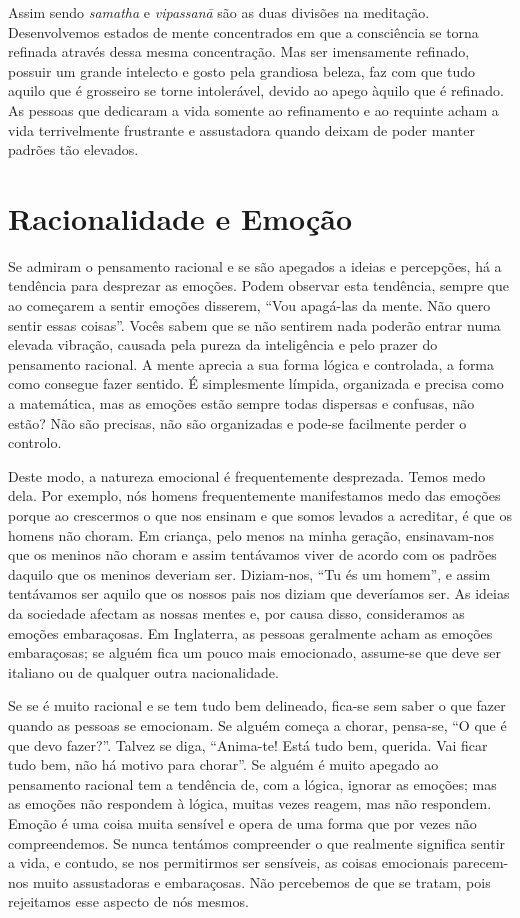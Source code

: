 Assim sendo \emph{samatha} e \emph{vipassanā} são as duas divisões na meditação.
Desenvolvemos estados de mente concentrados em que a consciência se torna
refinada através dessa mesma concentração. Mas ser imensamente refinado, possuir
um grande intelecto e gosto pela grandiosa beleza, faz com que tudo aquilo que é
grosseiro se torne intolerável, devido ao apego àquilo que é refinado. As
pessoas que dedicaram a vida somente ao refinamento e ao requinte acham a vida
terrivelmente frustrante e assustadora quando deixam de poder manter padrões tão
elevados.

\section{Racionalidade e Emoção}

Se admiram o pensamento racional e se são apegados a ideias e percepções, há a
tendência para desprezar as emoções. Podem observar esta tendência, sempre que
ao começarem a sentir emoções disserem, “Vou apagá-las da mente. Não quero
sentir essas coisas”. Vocês sabem que se não sentirem nada poderão entrar numa
elevada vibração, causada pela pureza da inteligência e pelo prazer do
pensamento racional. A mente aprecia a sua forma lógica e controlada, a forma
como consegue fazer sentido. É simplesmente límpida, organizada e precisa como a
matemática, mas as emoções estão sempre todas dispersas e confusas, não estão?
Não são precisas, não são organizadas e pode-se facilmente perder o controlo.

Deste modo, a natureza emocional é frequentemente desprezada. Temos medo dela.
Por exemplo, nós homens frequentemente manifestamos medo das emoções porque ao
crescermos o que nos ensinam e que somos levados a acreditar, é que os homens
não choram. Em criança, pelo menos na minha geração, ensinavam-nos que os
meninos não choram e assim tentávamos viver de acordo com os padrões daquilo que
os meninos deveriam ser. Diziam-nos, “Tu és um homem”, e assim tentávamos ser
aquilo que os nossos pais nos diziam que deveríamos ser. As ideias da sociedade
afectam as nossas mentes e, por causa disso, consideramos as emoções
embaraçosas. Em Inglaterra, as pessoas geralmente acham as emoções embaraçosas;
se alguém fica um pouco mais emocionado, assume-se que deve ser italiano ou de
qualquer outra nacionalidade.

Se se é muito racional e se tem tudo bem delineado, fica-se sem saber o que
fazer quando as pessoas se emocionam. Se alguém começa a chorar, pensa-se, “O
que é que devo fazer?”. Talvez se diga, “Anima-te! Está tudo bem, querida. Vai
ficar tudo bem, não há motivo para chorar”. Se alguém é muito apegado ao
pensamento racional tem a tendência de, com a lógica, ignorar as emoções; mas as
emoções não respondem à lógica, muitas vezes reagem, mas não respondem. Emoção é
uma coisa muita sensível e opera de uma forma que por vezes não compreendemos.
Se nunca tentámos compreender o que realmente significa sentir a vida, e
contudo, se nos permitirmos ser sensíveis, as coisas emocionais parecem-nos
muito assustadoras e embaraçosas. Não percebemos de que se tratam, pois
rejeitamos esse aspecto de nós mesmos.

